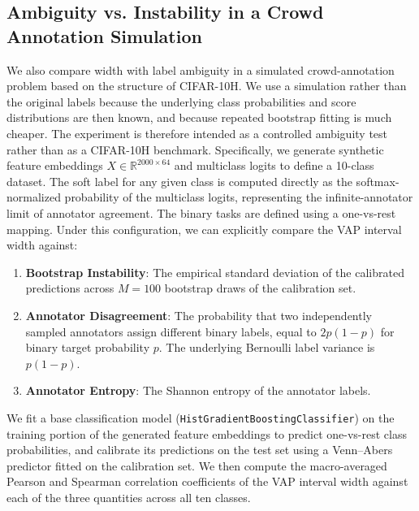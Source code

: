 \documentclass[11pt]{article}
\begin{document}
	\subsection{Ambiguity vs. Instability in a Crowd Annotation Simulation}
	\label{subsec:cifar_results}
	
	We also compare width with label ambiguity in a simulated crowd-annotation problem based on the structure of CIFAR-10H. We use a simulation rather than the original labels because the underlying class probabilities and score distributions are then known, and because repeated bootstrap fitting is much cheaper. The experiment is therefore intended as a controlled ambiguity test rather than as a CIFAR-10H benchmark. Specifically, we generate synthetic feature embeddings $X \in \mathbb{R}^{2000 \times 64}$ and multiclass logits to define a 10-class dataset. The soft label for any given class is computed directly as the softmax-normalized probability of the multiclass logits, representing the infinite-annotator limit of annotator agreement. The binary tasks are defined using a one-vs-rest mapping. Under this configuration, we can explicitly compare the VAP interval width against:
	\begin{enumerate}
		\item \textbf{Bootstrap Instability}: The empirical standard deviation of the calibrated predictions across $M=100$ bootstrap draws of the calibration set.
		\item \textbf{Annotator Disagreement}: The probability that two independently sampled annotators assign different binary labels, equal to $2p(1-p)$ for binary target probability $p$. The underlying Bernoulli label variance is $p(1-p)$.
		\item \textbf{Annotator Entropy}: The Shannon entropy of the annotator labels.
	\end{enumerate}
	
	We fit a base classification model (\texttt{HistGradientBoostingClassifier}) on the training portion of the generated feature embeddings to predict one-vs-rest class probabilities, and calibrate its predictions on the test set using a Venn--Abers predictor fitted on the calibration set. We then compute the macro-averaged Pearson and Spearman correlation coefficients of the VAP interval width against each of the three quantities across all ten classes.
	
	
	
\end{document}
